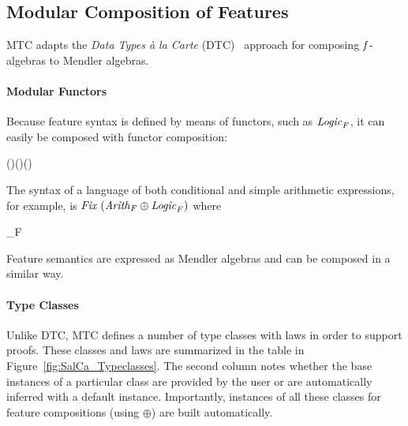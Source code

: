 \subsection{Modular Composition of Features}\label{sec:comp}

MTC adapts the \emph{Data Types \`a la Carte} (DTC)~\cite{swierstra08dtc}
approach for composing \ensuremath{\Varid{f}}-algebras to Mendler algebras.


\paragraph{Modular Functors} Because feature syntax is defined by means of
functors, such as \ensuremath{\Varid{Logic}_F}, it can easily be composed with functor
composition:
\begin{hscode}\SaveRestoreHook
{}%
%
%
\>[3]{}\;(\oplus)\;\;\;\mathrel{=}\;(\;)\mid {}\;(\;){}\<[E]%
\ColumnHook
\end{hscode}\resethooks
\noindent The syntax of a language of both conditional and simple
arithmetic expressions, for example, is \ensuremath{\Varid{Fix}\;(\Varid{Arith}_F\oplus\Varid{Logic}_F)} where
\begin{hscode}\SaveRestoreHook
{}%
%
%
\>[3]{}\;_F\;\mathrel{=}\;\mid {}\;\;\<[E]%
\ColumnHook
\end{hscode}\resethooks
Feature semantics are expressed as Mendler algebras and can be
composed in a similar way.



\paragraph{Type Classes}
Unlike DTC, MTC defines a number of type classes with laws in order to support
proofs.  These classes and laws are summarized in the table in
Figure~\ref{fig:SalCa_Typeclasses}.  The second column notes whether the base
instances of a particular class are provided by the user or are automatically
inferred with a default instance.  Importantly, instances of all these classes
for feature compositions (using \ensuremath{\oplus}) are built automatically.

